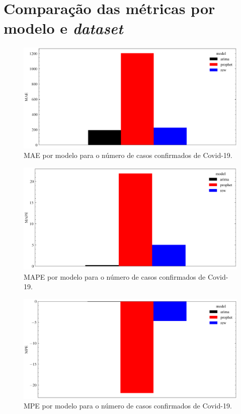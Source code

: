 \chapter{Comparação das métricas por modelo e \textit{dataset}}
\label{apen:a}

\begin{figure}[!htp]
    \centering
    \includegraphics[width=5.0in]{img/covid_mae_comparison.pdf}
    \caption{MAE por modelo para o número de casos confirmados de Covid-19.}
\end{figure}

\begin{figure}[!htp]
    \centering
    \includegraphics[width=5.0in]{img/covid_mape_comparison.pdf}
    \caption{MAPE por modelo para o número de casos confirmados de Covid-19.}
\end{figure}

\begin{figure}[!htp]
    \centering
    \includegraphics[width=5.0in]{img/covid_mpe_comparison.pdf}
    \caption{MPE por modelo para o número de casos confirmados de Covid-19.}
\end{figure}

